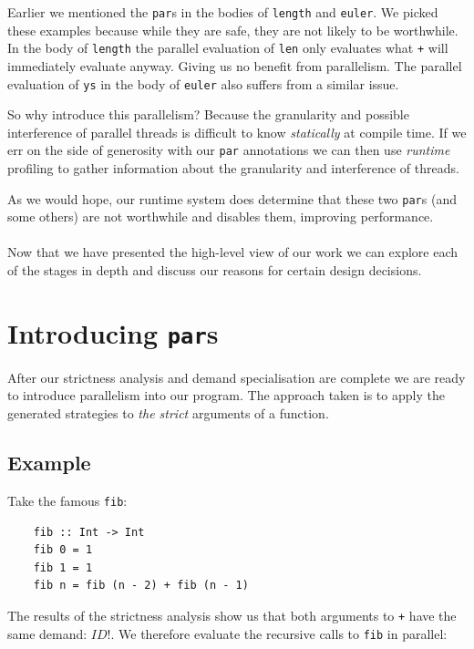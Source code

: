 Earlier we mentioned the \verb-par-s in the bodies of \verb-length- and
\verb-euler-. We picked these examples because while they are safe, they are
not likely to be worthwhile. In the body of \verb-length- the parallel
evaluation of \verb-len- only evaluates what \verb-+- will immediately evaluate
anyway. Giving us no benefit from parallelism. The parallel evaluation of
\verb-ys- in the body of \verb-euler- also suffers from a similar issue.

So why introduce this parallelism? Because the granularity and possible
interference of parallel threads is difficult to know \emph{statically} at
compile time. If we err on the side of generosity with our \verb-par-
annotations we can then use \emph{runtime} profiling to gather information
about the granularity and interference of threads. 

As we would hope, our runtime system does determine that these two \verb-par-s (and some
others) are not worthwhile and disables them, improving performance.

\paragraph{}

Now that we have presented the high-level view of our work we can explore each of
the stages in depth and discuss our reasons for certain design decisions.

%
%
\section{Introducing \texttt{par}s}
\label{sec:introPar}

After our strictness analysis and demand specialisation are complete we are
ready to introduce parallelism into our program. The approach taken is to apply
the generated strategies to \emph{the strict} arguments of a function. 

\subsection*{Example}

Take the famous \verb-fib-:

\begin{verbatim}
    fib :: Int -> Int
    fib 0 = 1
    fib 1 = 1
    fib n = fib (n - 2) + fib (n - 1)
\end{verbatim}

The results of the strictness analysis show us that both arguments to \verb-+-
have the same demand: $ID!$. We therefore evaluate the recursive
calls to \verb-fib- in parallel:

